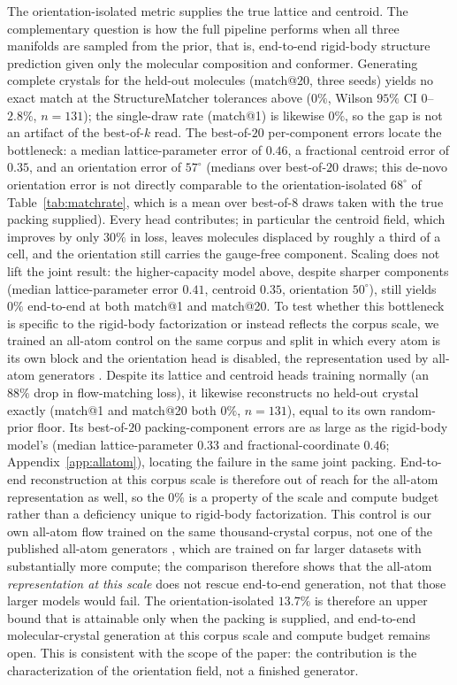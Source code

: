 \documentclass[10pt]{article}
\begin{document}
The orientation-isolated metric supplies the true lattice and centroid. The
complementary question is how the full pipeline performs when all three manifolds
are sampled from the prior, that is, end-to-end rigid-body structure prediction
given only the molecular composition and conformer. Generating complete crystals
for the held-out molecules (match@20, three seeds) yields no exact match at the
StructureMatcher tolerances above ($0\%$, Wilson $95\%$ CI $0$--$2.8\%$,
$n=131$); the single-draw rate (match@1) is likewise $0\%$, so the gap is not an
artifact of the best-of-$k$ read. The best-of-$20$ per-component errors locate the
bottleneck: a median lattice-parameter error of $0.46$, a fractional centroid
error of $0.35$, and an orientation error of $57^\circ$ (medians over best-of-$20$
draws; this de-novo orientation error is not directly comparable to the
orientation-isolated $68^\circ$ of Table~\ref{tab:matchrate}, which is a mean over
best-of-$8$ draws taken with the true packing supplied). Every head contributes; in particular the
centroid field, which improves by only $30\%$ in loss, leaves molecules displaced
by roughly a third of a cell, and the orientation still carries the gauge-free
component. Scaling does not lift the joint result: the higher-capacity model
above, despite sharper components (median lattice-parameter error $0.41$,
centroid $0.35$, orientation $50^\circ$), still yields $0\%$ end-to-end at both
match@1 and match@20. To test whether this bottleneck is specific to the
rigid-body factorization or instead reflects the corpus scale, we trained an
all-atom control on the same corpus and split in which every atom is its own
block and the orientation head is disabled, the representation used by all-atom
generators \citep{jin2025oxtal,subramanian2026packflow}. Despite its lattice and
centroid heads training normally (an $88\%$ drop in flow-matching loss), it
likewise reconstructs no held-out crystal exactly (match@1 and match@20 both
$0\%$, $n=131$), equal to its own random-prior floor. Its best-of-$20$
packing-component errors are as large as the rigid-body model's (median
lattice-parameter $0.33$ and fractional-coordinate $0.46$;
Appendix~\ref{app:allatom}), locating the failure in the same joint packing. End-to-end reconstruction
at this corpus scale is therefore out of reach for the all-atom representation as
well, so the $0\%$ is a property of the scale and compute budget rather than a
deficiency unique to rigid-body factorization. This control is our own all-atom
flow trained on the same thousand-crystal corpus, not one of the published
all-atom generators \citep{jin2025oxtal,subramanian2026packflow}, which are trained
on far larger datasets with substantially more compute; the comparison therefore
shows that the all-atom \emph{representation at this scale} does not rescue
end-to-end generation, not that those larger models would fail. The
orientation-isolated $13.7\%$ is therefore an upper bound that is attainable only
when the packing is supplied, and end-to-end molecular-crystal generation at this
corpus scale and compute budget remains open. This is consistent with the scope
of the paper: the contribution is the characterization of the orientation field,
not a finished generator.
\end{document}
